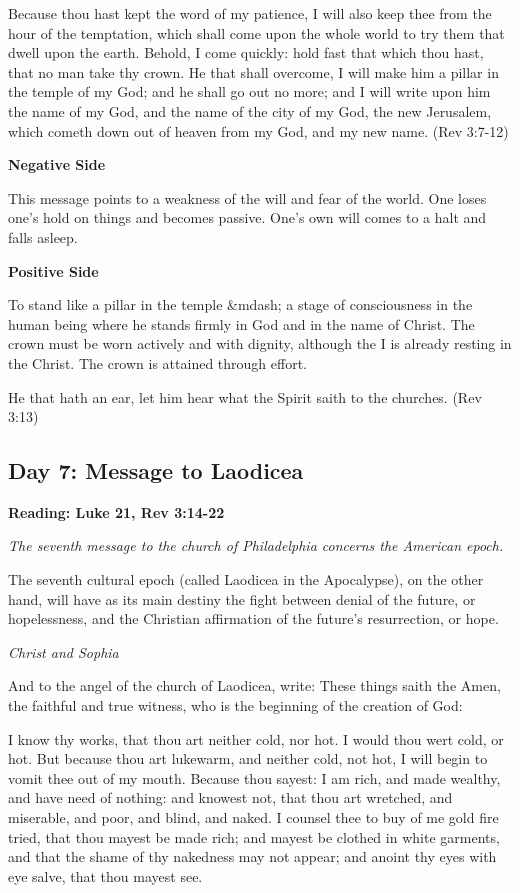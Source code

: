 Because thou hast kept the word of my patience, I will also keep thee from the hour of the temptation, which shall come
upon the whole world to try them that dwell upon the earth. Behold, I come quickly: hold fast that which thou hast,
that no man take thy crown. He that shall overcome, I will make him a pillar in the temple of my God; and he shall go
out no more; and I will write upon him the name of my God, and the name of the city of my God, the new Jerusalem, which
cometh down out of heaven from my God, and my new name. (Rev 3:7-12)

\textbf{Negative Side}

This message points to a weakness of the will and fear of the world. One loses one's hold on things
and becomes passive. One's own will comes to a halt and falls asleep.

\textbf{Positive Side}

To stand like a pillar in the temple \&mdash; a stage of consciousness in the human being where he stands firmly in God
and in the name of Christ. The crown must be worn actively and with dignity, although the I is already resting in the
Christ. The crown is attained through effort.

He that hath an ear, let him hear what the Spirit saith to the churches. (Rev 3:13)

\subsection*{Day 7: Message to Laodicea}
\textbf{Reading: Luke 21, Rev 3:14-22}

\emph{The seventh message to the church of Philadelphia concerns the American epoch.}

\begin{quotationx}
The seventh cultural epoch (called Laodicea in the Apocalypse), on the other hand, will have as its main destiny the
fight between denial of the future, or hopelessness, and the Christian affirmation of the future's
resurrection, or hope. \begin{flushright} \emph{Christ and Sophia}\end{flushright}

\end{quotationx}
And to the angel of the church of Laodicea, write: These things saith the Amen, the faithful and true witness, who is
the beginning of the creation of God:

I know thy works, that thou art neither cold, nor hot. I would thou wert cold, or hot. But because thou art lukewarm,
and neither cold, not hot, I will begin to vomit thee out of my mouth. Because thou sayest: I am rich, and made
wealthy, and have need of nothing: and knowest not, that thou art wretched, and miserable, and poor, and blind, and
naked. I counsel thee to buy of me gold fire tried, that thou mayest be made rich; and mayest be clothed in white
garments, and that the shame of thy nakedness may not appear; and anoint thy eyes with eye salve, that thou mayest see.

